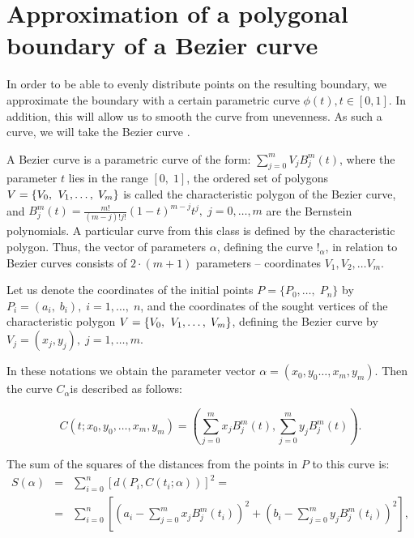 \documentclass[12pt]{article}
\begin{document}
 \section{Approximation of a polygonal boundary of a Bezier curve}

 In order to be able to evenly distribute points on the resulting boundary,
 we approximate the boundary with a certain parametric curve $\phi(t), t \in [0, 1]$.
 In addition, this will allow us to smooth the curve from unevenness.
 As such a curve, we will take the Bezier curve \cite{mesteckiy}.
 
 A Bezier curve is a parametric curve of the form: $\sum _{j=0}^{m}V_{j} B_{j}^{m} \left(t\right) $,
 where the parameter $t$ lies in the range $\left[0,\; 1\right]$,
 the ordered set of polygons $V=\left\{V_{0} ,{\kern 1pt} \; V_{1} ,\ldots ,\; V_{m} \right\}$
 is called the characteristic polygon of the Bezier curve,
 and $B_{j}^{m} (t)=\frac{m!}{(m-j)!j!} (1-t)^{m-j} t^{j} ,\; j=0,\ldots ,m$ are the Bernstein polynomials.
 A particular curve from this class is defined by the characteristic polygon.
 Thus, the vector of parameters $\alpha $, defining the curve $!_{\alpha } $,
 in relation to Bezier curves consists of $2\cdot (m+1)$ parameters -- coordinates $V_{1} ,V_{2} ,\ldots V_{m} $.
 
 Let us denote the coordinates of the initial points $P=\{ P_{0} ,\ldots ,\; P_{n} \} $ by $P_{i} =(a_{i} ,\; b_{i} ),\; i=1,\ldots ,\; n$,
 and the coordinates of the sought vertices of the characteristic polygon $V=\left\{V_{0} ,{\kern 1pt} \; V_{1} ,\ldots ,\; V_{m} \right\}$,
 defining the Bezier curve by $V_{j} =(x_{j} ,y_{j} ),\; j=1,\ldots ,m$.
 
 In these notations we obtain the parameter vector $\alpha =(x_{0} ,y_{0} \ldots ,x_{m} ,y_{m} )$. Then the curve $C_{\alpha } $is described as follows:
 
 \begin{equation}
   C(t;x_{0} ,y_{0} ,\ldots ,x_{m} ,y_{m} )=(\sum _{j=0}^{m}x_{j} B_{j}^{m} (t),\sum _{j=0}^{m}y_{j} B_{j}^{m} (t)  ).
 \end{equation}
 
 The sum of the squares of the distances from the points in $P$ to this curve is:
 \begin{eqnarray}
 \label{slabel}
 S(\alpha ) &=& \sum _{i=0}^{n}\left[d\left(P_{i} ,C(t_{i} ;\alpha )\right)\right] ^{2} = \nonumber \\
 &=& \sum _{i=0}^{n}\left[\left(a_{i} -\sum _{j=0}^{m}x_{j} B_{j}^{m} (t_{i} ) \right)^{2} +\left(b_{i} -\sum _{j=0}^{m}y_{j} B_{j}^{m} (t_{i} ) \right)^{2} \right],
 \end{eqnarray}
 
\end{document}
